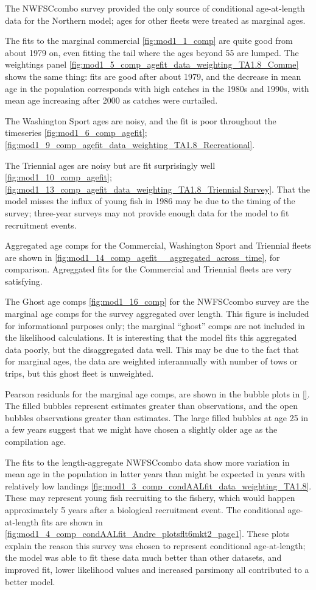 \documentclass[12pt,]{article}
\begin{document}
The NWFSCcombo survey provided the only source of conditional
age-at-length data for the Northern model; ages for other fleets were
treated as marginal ages.

The fits to the marginal commercial \ref{fig:mod1_1_comp} are quite good
from about 1979 on, even fitting the tail where the ages beyond 55 are
lumped. The weightings panel
\ref{fig:mod1_5_comp_agefit_data_weighting_TA1.8_Comme} shows the same
thing: fits are good after about 1979, and the decrease in mean age in
the population corresponds with high catches in the 1980s and 1990s,
with mean age increasing after 2000 as catches were curtailed.

The Washington Sport ages are noisy, and the fit is poor throughout the
timeseries \ref{fig:mod1_6_comp_agefit};
\ref{fig:mod1_9_comp_agefit_data_weighting_TA1.8_Recreational}.

The Triennial ages are noisy but are fit surprisingly well
\ref{fig:mod1_10_comp_agefit};
\ref{fig:mod1_13_comp_agefit_data_weighting_TA1.8_Triennial Survey}.
That the model misses the influx of young fish in 1986 may be due to the
timing of the survey; three-year surveys may not provide enough data for
the model to fit recruitment events.

Aggregated age comps for the Commercial, Washington Sport and Triennial
fleets are shown in
\ref{fig:mod1_14_comp_agefit__aggregated_across_time}, for comparison.
Agreggated fits for the Commercial and Triennial fleets are very
satisfying.

The Ghost age comps \ref{fig:mod1_16_comp} for the NWFSCcombo survey are
the marginal age comps for the survey aggregated over length. This
figure is included for informational purposes only; the marginal
``ghost'' comps are not included in the likelihood calculations. It is
interesting that the model fits this aggregated data poorly, but the
disaggregated data well. This may be due to the fact that for marginal
ages, the data are weighted interannually with number of tows or trips,
but this ghost fleet is unweighted.

Pearson residuals for the marginal age comps, are shown in the bubble
plots in \ref{}. The filled bubbles represent estimates greater than
observations, and the open bubbles observations greater than estimates.
The large filled bubbles at age 25 in a few years suggest that we might
have chosen a slightly older age as the compilation age.

The fits to the length-aggregate NWFSCcombo data show more variation in
mean age in the population in latter years than might be expected in
years with relatively low landings
\ref{fig:mod1_3_comp_condAALfit_data_weighting_TA1.8}. These may
represent young fish recruiting to the fishery, which would happen
approximately 5 years after a biological recruitment event. The
conditional age-at-length fits are shown in
\ref{fig:mod1_4_comp_condAALfit_Andre_plotsflt6mkt2_page1}. These plots
explain the reason this survey was chosen to represent conditional
age-at-length; the model was able to fit these data much better than
other datasets, and improved fit, lower likelihood values and increased
parsimony all contributed to a better model.
\end{document}
